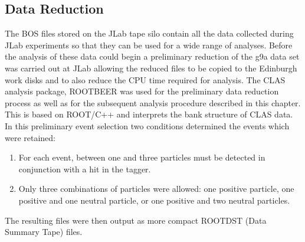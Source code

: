 \subsection{Data Reduction}
The BOS files stored on the JLab tape silo contain all the data collected during JLab experiments so that they can be used for a wide range of analyses. Before the analysis of these data could begin a preliminary reduction of the g9a data set was carried out at JLab allowing the reduced files to be copied to the Edinburgh work disks and to also reduce the CPU time required for analysis. The CLAS analysis package, ROOTBEER \cite{rootbeer} was used for the preliminary data reduction process as well as for the subsequent analysis procedure described in this chapter. This is based on ROOT/C++ and interprets the bank structure of CLAS data. In this preliminary event selection two conditions determined the events which were retained:
\begin{enumerate}
\item  For each event, between one and three particles must be detected in conjunction with a hit in the tagger.
\item  Only three combinations of particles were allowed: one positive particle, one positive and one neutral particle, or one positive and two neutral particles. 
\end{enumerate}
The resulting files were then output as more compact ROOTDST (Data Summary Tape) files.

